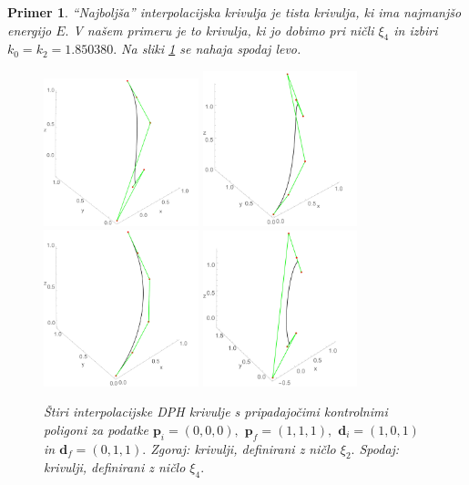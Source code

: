 \documentclass[12pt,a4paper,twoside]{article}
\theoremstyle{definition} %
\theoremstyle{plain} %
\theoremstyle{primerstyle}
\newtheorem{primer}[definicija]{Primer}
\numberwithin{equation}{section}  %
\newcommand{\dV}{\mathbf{d}}
\newcommand{\pV}{\mathbf{p}}
\begin{document}
\begin{primer}
	``Najboljša'' interpolacijska krivulja je tista krivulja, ki ima najmanjšo energijo $E.$ V našem primeru je to krivulja, ki jo dobimo pri ničli $\xi_4$ in izbiri $k_0=k_2=1.850380.$ Na sliki \ref{hermit_grafi_krivulj} se nahaja spodaj levo.
	\begin{figure}[h!]
	  \centering
	  \includegraphics[width=0.4\textwidth]{images/hermit1.pdf}
	  \includegraphics[width=0.4\textwidth]{images/hermit2.pdf}
	  \includegraphics[width=0.4\textwidth]{images/hermit3.pdf}
	  \includegraphics[width=0.4\textwidth]{images/hermit4.pdf}
	  \caption[Interpolacijske DPH krivulje]{Štiri interpolacijske DPH krivulje s pripadajočimi kontrolnimi poligoni za podatke $\pV_i=(0,0,0),$ $\pV_f=(1,1,1),$ $\dV_i=(1,0,1)$ in $\dV_f=(0,1,1).$ Zgoraj: krivulji, definirani z ničlo $\xi_2.$ Spodaj: krivulji, definirani z ničlo $\xi_4.$}
	  \label{hermit_grafi_krivulj}
	\end{figure}
\end{primer}
\clearpage
\end{document}
